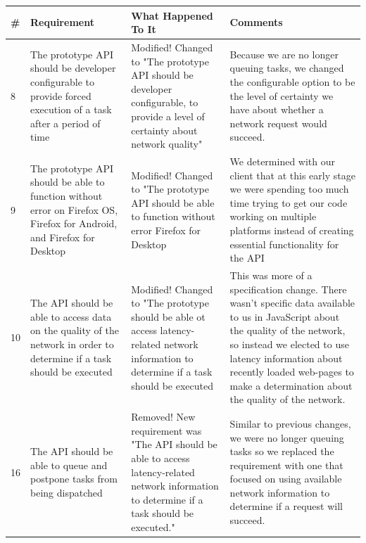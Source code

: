 \documentclass[12pt]{article}
\begin{document}
\begin{tabularx}{\textwidth}{|p{1cm}|X|X|X|}
\hline
\#  & Requirement 				& What Happened To It 		  & Comments \\ \hline
8 & The prototype API should be developer configurable to provide forced execution of a task after a period of time & Modified! Changed to "The prototype API should be developer configurable, to provide a level of certainty about network quality" & Because we are no longer queuing tasks, we changed the configurable option to be the level of certainty we have about whether a network request would succeed. \\ \hline
9 & The prototype API should be able to function without error on Firefox OS, Firefox for Android, and Firefox for Desktop & Modified! Changed to "The prototype API should be able to function without error Firefox for Desktop & We determined with our client that at this early stage we were spending too much time trying to get our code working on multiple platforms instead of creating essential functionality for the API \\ \hline
10 & The API should be able to access data on the quality of the network in order to determine if a task should be executed & Modified! Changed to "The prototype should be able ot access latency-related network information to determine if a task should be executed & This was more of a specification change.  There wasn't specific data available to us in JavaScript about the quality of the network, so instead we elected to use latency information about recently loaded web-pages to make a determination about the quality of the network. \\ \hline
16 & The API should be able to queue and postpone tasks from being dispatched & Removed! New requirement was "The API should be able to access latency-related network information to determine if a task should be executed." & Similar to previous changes, we were no longer queuing tasks so we replaced the requirement with one that focused on using available network information to determine if a request will succeed. \\ \hline
\end{tabularx}
\pagebreak
\end{document}
